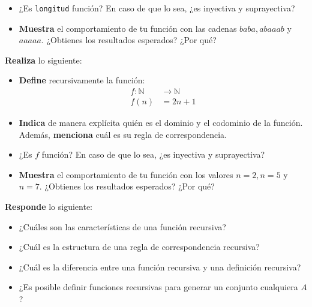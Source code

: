 \documentclass[oneside]{style}
\begin{document}
\begin{questions}[label=\protect\circled{\bfseries\arabic*}]
{\begin{itemize}
            \item ¿Es \texttt{longitud} función? En caso de que lo sea, ¿es 
            inyectiva y suprayectiva?

            \item \textbf{Muestra} el comportamiento de tu función con las 
            cadenas $baba, abaaab$ y $aaaaa$. ¿Obtienes los resultados esperados?
            ¿Por qué?
        \end{itemize}
    }

    \question
    {
        \textbf{Realiza} lo siguiente:
        \begin{itemize}
            \item \textbf{Define} recursivamente la función:
            \begin{align*}
                f: \mathbb{N} &\rightarrow \mathbb{N} \\ 
                f(n) &= 2n + 1
            \end{align*}  

            \item \textbf{Indica} de manera explícita quién es el dominio y el 
            codominio de la función. Además, \textbf{menciona} cuál es su regla 
            de correspondencia.

            \item ¿Es $f$ función? En caso de que lo sea, ¿es inyectiva y 
            suprayectiva?

            \item \textbf{Muestra} el comportamiento de tu función con los valores 
            $n = 2, n = 5$ y $n = 7$. ¿Obtienes los resultados esperados?
            ¿Por qué?
        \end{itemize}
    }

    \question
    {
        \textbf{Responde} lo siguiente: 
        \begin{itemize}
            \item ¿Cuáles son las características de una función recursiva?
            \item ¿Cuál es la estructura de una regla de correspondencia 
            recursiva?
            \item ¿Cuál es la diferencia entre una función recursiva y una 
            definición recursiva?
            \item ¿Es posible definir funciones recursivas para generar un 
            conjunto cualquiera $A$?
        \end{itemize}
    }


\end{questions}
\end{document}
